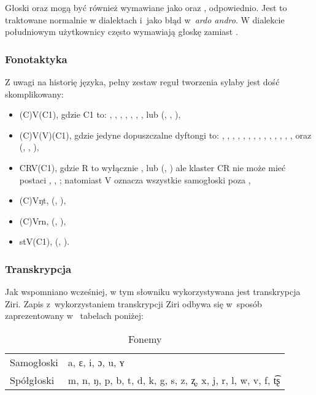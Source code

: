 \begin{spacing}{1.1}
Głoski  oraz  mogą być również wymawiane jako  oraz ,
odpowiednio. Jest to traktowane normalnie w dialektach i~jako błąd w~\emph{ardo
andro}. W dialekcie południowym użytkownicy często wymawiają głoskę 
zamiast .

\subsubsection{Fonotaktyka}

Z uwagi na historię języka, pełny zestaw reguł tworzenia sylaby jest dość
skomplikowany:

\begin{itemize}
	\item (C)V(C1), gdzie C1 to: , , , , , , ,  lub  (, , ),
	\item (C)V(V)(C1), gdzie jedyne dopuszczalne dyftongi to: , , , , , , , , , , , , , ,  oraz  (, , ),
	\item CRV(C1), gdzie R to wyłącznie ,  lub  (, ) ale klaster CR nie może mieć postaci , , ; natomiast V oznacza wszystkie samogłoski poza ,
	\item (C)Vŋt, (, ),
	\item (C)Vrn, (, ),
	\item stV(C1), (, ).
\end{itemize}

\subsubsection{Transkrypcja}

Jak wspomniano wcześniej, w tym słowniku wykorzystywana jest transkrypcja Ziri. 
Zapis z~wykorzystaniem transkrypcji Ziri odbywa się w~sposób zaprezentowany w~
tabelach poniżej:

\begin{table}[ht]
	\centering
	\caption{Fonemy}
	\begin{tabular}{ll} \toprule
		Samogłoski & a, ɛ, i, ɔ, u, ʏ \\
		Spółgłoski & m, n, ŋ, p, b, t, d, k, g, s, z, ʐ, x, j, r, l, w, v, f, t͡ʂ \\\bottomrule
	\end{tabular}
	\label{tab:phonemes}
\end{table}


\end{spacing}
